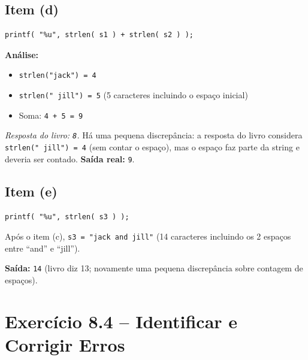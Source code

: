 \documentclass[12pt,a4paper]{article}
\begin{document}
\subsection*{Item (d)}
\begin{respostabox}
\begin{lstlisting}
printf( "%u", strlen( s1 ) + strlen( s2 ) );
\end{lstlisting}

\textbf{Análise:}
\begin{itemize}[noitemsep]
  \item \texttt{strlen("jack") = 4}
  \item \texttt{strlen(" jill") = 5} (5 caracteres incluindo o espaço inicial)
  \item Soma: \texttt{4 + 5 = 9}
\end{itemize}

\textit{Resposta do livro: \texttt{8}.} Há uma pequena discrepância: a resposta do
livro considera \texttt{strlen(" jill") = 4} (sem contar o espaço), mas o espaço
faz parte da string e deveria ser contado. \textbf{Saída real:} \texttt{9}.
\end{respostabox}

\subsection*{Item (e)}
\begin{respostabox}
\begin{lstlisting}
printf( "%u", strlen( s3 ) );
\end{lstlisting}

Após o item (c), \texttt{s3 = "jack and  jill"} (14 caracteres incluindo os 2 espaços
entre ``and'' e ``jill'').

\textbf{Saída:} \texttt{14} \quad (livro diz 13; novamente uma pequena discrepância
sobre contagem de espaços).
\end{respostabox}

\newpage

\section{Exercício 8.4 -- Identificar e Corrigir Erros}
\end{document}
